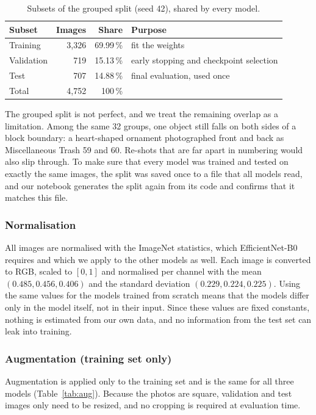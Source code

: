 \documentclass{article}
\begin{document}
\begin{table}[H]
\centering
\caption{Subsets of the grouped split (seed 42), shared by every model.}
\label{tab:split}
\begin{tabular}{lrrl}
\toprule
Subset & Images & Share & Purpose \\
\midrule
Training & 3,326 & 69.99\,\% & fit the weights \\
Validation & 719 & 15.13\,\% & early stopping and checkpoint selection \\
Test & 707 & 14.88\,\% & final evaluation, used once \\
\midrule
Total & 4,752 & 100\,\% & \\
\bottomrule
\end{tabular}
\end{table}

The grouped split is not perfect, and we treat the remaining overlap as a limitation. Among the same 32 groups, one object still falls on both sides of a block boundary: a heart-shaped ornament photographed front and back as Miscellaneous Trash 59 and 60. Re-shots that are far apart in numbering would also slip through. To make sure that every model was trained and tested on exactly the same images, the split was saved once to a file that all models read, and our notebook generates the split again from its code and confirms that it matches this file.

\subsubsection{Normalisation}

All images are normalised with the ImageNet statistics, which EfficientNet-B0 requires and which we apply to the other models as well. Each image is converted to RGB, scaled to $[0,1]$ and normalised per channel with the mean $(0.485, 0.456, 0.406)$ and the standard deviation $(0.229, 0.224, 0.225)$. Using the same values for the models trained from scratch means that the models differ only in the model itself, not in their input. Since these values are fixed constants, nothing is estimated from our own data, and no information from the test set can leak into training.

\subsubsection{Augmentation (training set only)}

Augmentation is applied only to the training set and is the same for all three models (Table~\ref{tab:aug}). Because the photos are square, validation and test images only need to be resized, and no cropping is required at evaluation time.
\end{document}
